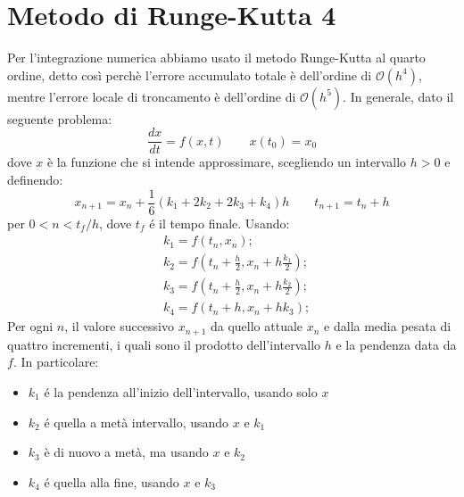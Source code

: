 \section{Metodo di Runge-Kutta 4}
Per l'integrazione numerica abbiamo usato il metodo Runge-Kutta al quarto ordine, detto così perchè l'errore accumulato totale è dell'ordine di $ \mathcal{O}(h^{4}) $, mentre l'errore locale di troncamento è dell'ordine di $ \mathcal{O}(h^{5}) $. 
In generale, dato il seguente problema:
\begin{equation} 
\frac{dx}{dt}=f(x,t)\qquad x(t_{0})=x_{0}
\end{equation}
dove $ x $ è la funzione che si intende approssimare, scegliendo un intervallo $ h>0 $ e definendo:
\begin{equation} 
	x_{n+1}=x_{n}+\frac{1}{6}(k_{1}+2k_{2}+2k_{3}+k_{4})h \qquad t_{n+1}=t_{n}+h
\end{equation}
per $ 0<n<t_{f}/h $, dove $ t_{f} $ é il tempo finale. Usando:
\begin{equation} 
	\begin{aligned}
	&k_{1}=f(t_{n}, x_{n});\\
	&k_{2}=f(t_{n}+\frac{h}{2}, x_{n}+h\frac{k_{1}}{2});\\
	&k_{3}=f(t_{n}+\frac{h}{2}, x_{n}+h\frac{k_{2}}{2});\\
	&k_{4}=f(t_{n}+h, x_{n}+hk_{3});
\end{aligned}
\end{equation}
Per ogni $ n $, il valore successivo $ x_{n+1} $ da quello attuale $ x_{n} $ e dalla media pesata di quattro incrementi, i quali sono il prodotto dell'intervallo $ h $ e la pendenza data da $ f $. In particolare:
\begin{itemize}
	\item $ k_{1} $ é la pendenza all'inizio dell'intervallo, usando solo $ x $ 
	\item $ k_{2} $ é quella a metà intervallo, usando $ x $ e $ k_{1} $
	\item $ k_{3} $ è di nuovo a metà, ma usando $ x $ e $ k_{2} $
	\item $ k_{4} $ é quella alla fine, usando $ x $ e $ k_{3} $
\end{itemize}
